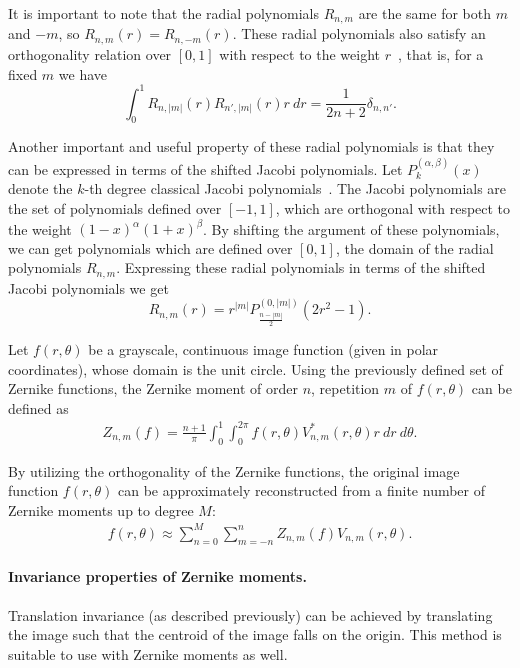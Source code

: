 It is important to note that the radial polynomials $R_{n,m}$ are the same for both $m$ and $-m$, so $R_{n,m}(r) = R_{n,-m}(r)$. These radial polynomials also satisfy an orthogonality relation over $[0,1]$ with respect to the weight $r$~\cite{schipp}, that is, for a fixed $m$ we have
\begin{equation}\label{Rortho}
	\int_0^1 R_{n,|m|}(r) R_{n',|m|}(r)r\ dr  = \frac{1}{2n+2} \delta_{n,n'}.
\end{equation}


Another important and useful property of these radial polynomials is that they can be expressed in terms of the shifted Jacobi polynomials. Let $P_k^{(\alpha, \beta)}(x)$ denote the $k$-th degree classical Jacobi polynomials~\cite{Szego}. The Jacobi polynomials are the set of polynomials defined over $[-1,1]$, which are orthogonal with respect to the weight $(1-x)^\alpha(1+x)^\beta$. By shifting the argument of these polynomials, we can get polynomials which are defined over $[0,1]$, the domain of the radial polynomials $R_{n,m}$. Expressing these radial polynomials in terms of the shifted Jacobi polynomials we get
\begin{equation}\label{RJacobi}
	R_{n,m}(r) = r^{|m|} P_{\frac{n - |m|}{2}}^{(0,|m|)}(2r^2-1).
\end{equation} 


Let $f(r,\theta)$ be a grayscale, continuous image function (given in polar coordinates), whose domain is the unit circle.
Using the previously defined set of Zernike functions, the Zernike moment of order $n$, repetition $m$ of $f(r,\theta)$ can be defined as
\begin{gather}\label{eq:complex_zernike_def}
    Z_{n,m}(f) = \frac{n + 1}{\pi}\int_0^1\int_0^{2\pi}f(r,\theta)V_{n,m}^{*}(r,\theta)r\ dr\ d\theta.
\end{gather}


By utilizing the orthogonality of the Zernike functions, the original image function $f(r,\theta)$ can be approximately reconstructed from a finite number of Zernike moments up to degree $M$:
\begin{gather}\label{eq:reconstruction}
    f(r,\theta) \approx \sum_{n=0}^{M}\sum_{m=-n}^{n}Z_{n,m}(f)V_{n,m}(r,\theta).
\end{gather}

\paragraph{Invariance properties of Zernike moments.} Translation invariance (as described previously) can be achieved by translating the image such that the centroid of the image falls on the origin. This method is suitable to use with Zernike moments as well.


